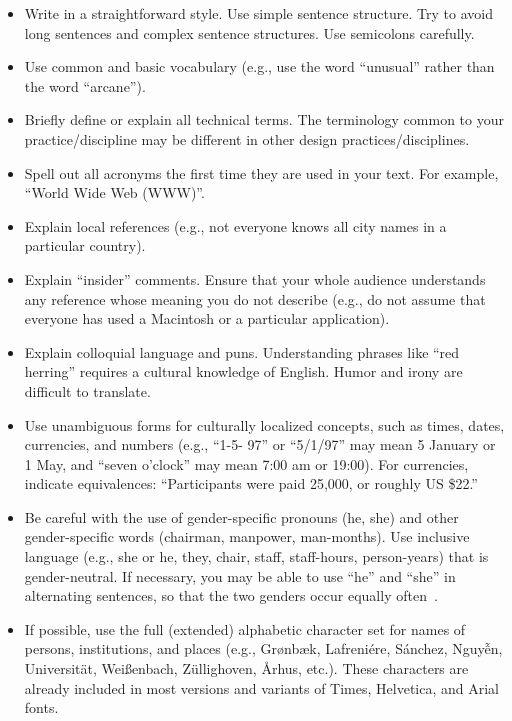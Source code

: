 \documentclass{sigchi-ext}
\begin{document}
\begin{itemize}\compresslist%
\item Write in a straightforward style. Use simple sentence
  structure. Try to avoid long sentences and complex sentence
  structures. Use semicolons carefully.
\item Use common and basic vocabulary (e.g., use the word ``unusual''
  rather than the word ``arcane'').
\item Briefly define or explain all technical terms. The terminology
  common to your practice/discipline may be different in other design
  practices/disciplines.
\item Spell out all acronyms the first time they are used in your
  text. For example, ``World Wide Web (WWW)''.
\item Explain local references (e.g., not everyone knows all city
  names in a particular country).
\item Explain ``insider'' comments. Ensure that your whole audience
  understands any reference whose meaning you do not describe (e.g.,
  do not assume that everyone has used a Macintosh or a particular
  application).
\item Explain colloquial language and puns. Understanding phrases like
  ``red herring'' requires a cultural knowledge of English. Humor and
  irony are difficult to translate.
\item Use unambiguous forms for culturally localized concepts, such as
  times, dates, currencies, and numbers (e.g., ``1-5- 97'' or
  ``5/1/97'' may mean 5 January or 1 May, and ``seven o'clock'' may
  mean 7:00 am or 19:00). For currencies, indicate equivalences:
  ``Participants were paid {\selectfont \textwon}
  25,000, or roughly US \$22.''
\item Be careful with the use of gender-specific pronouns (he, she)
  and other gender-specific words (chairman, manpower,
  man-months). Use inclusive language (e.g., she or he, they, chair,
  staff, staff-hours, person-years) that is gender-neutral. If
  necessary, you may be able to use ``he'' and ``she'' in alternating
  sentences, so that the two genders occur equally
  often~\cite{Schwartz:1995:GBF}.
\item If possible, use the full (extended) alphabetic character set
  for names of persons, institutions, and places (e.g.,
  Gr{\o}nb{\ae}k, Lafreni\'ere, S\'anchez, Nguy{\~{\^{e}}}n,
  Universit{\"a}t, Wei{\ss}enbach, Z{\"u}llighoven, \r{A}rhus, etc.).
  These characters are already included in most versions and variants
  of Times, Helvetica, and Arial fonts.
\end{itemize}
\end{document}

